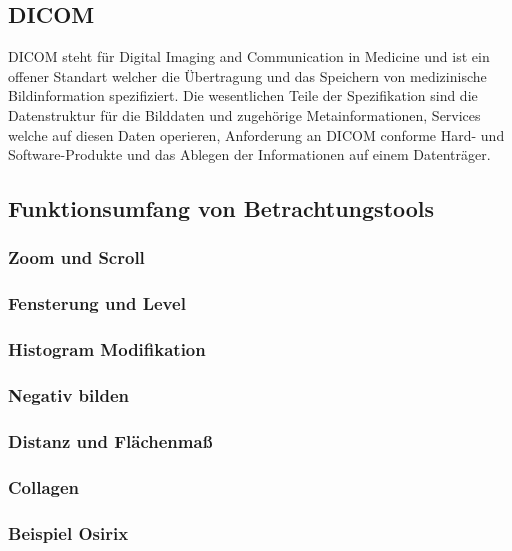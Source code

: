 \subsection{DICOM}
\label{sec:DICOM}
DICOM steht für Digital Imaging and Communication in Medicine und ist ein offener Standart welcher die Übertragung und das Speichern von medizinische Bildinformation spezifiziert.
Die wesentlichen Teile der Spezifikation sind die Datenstruktur für die Bilddaten und zugehörige Metainformationen, 
Services welche auf diesen Daten operieren, Anforderung an DICOM conforme Hard- und Software-Produkte und das Ablegen der Informationen auf einem Datenträger.


\subsection{Funktionsumfang von Betrachtungstools}
\label{sec:Funktionsumfang von Betrachtungstools}

\subsubsection{Zoom und Scroll}
\subsubsection{Fensterung und Level}
\subsubsection{Histogram Modifikation}
\subsubsection{Negativ bilden}
\subsubsection{Distanz und Flächenmaß}
\subsubsection{Collagen}
\subsubsection{Beispiel Osirix}
\label{sec:Beispiel Osirix}

